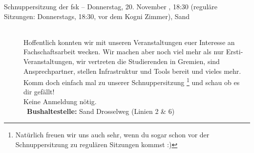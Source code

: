 \begin{description}
\ifkogwiss
     \item[Schnuppersitzung der fsk -- Donnerstag, 20. November \YEAR, 18:30 (reguläre Sitzungen: Donnerstags, 18:30, vor dem Kogni Zimmer), Sand]~\\%
     Hoffentlich konnten wir mit unseren Veranstaltungen euer Interesse an Fachschaftsarbeit wecken.
     Wir machen aber noch viel mehr als nur Ersti-Veranstaltungen, wir vertreten die Studierenden in Gremien,
     sind Ansprechpartner, stellen Infrastruktur und Tools bereit und vieles mehr.
     Komm doch einfach mal zu unserer Schnuppersitzung
     \footnote{Natürlich freuen wir uns auch sehr, wenn du sogar schon vor der Schnuppersitzung zu regulären Sitzungen kommst :)}
     und schau ob es dir gefällt!\\
     Keine Anmeldung nötig.\\
     ~\textbf{Bushaltestelle:} Sand Drosselweg (Linien 2 \& 6)
\else
    \ifml
    \else
    \fi
\fi







\end{description}
